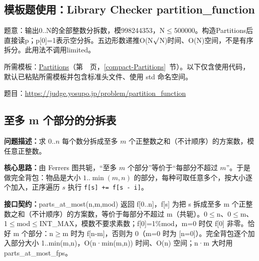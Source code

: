 

\Needspace{275pt}

\subsection*{模板题使用：Library Checker partition\_function}

\label{usage-example-158}

题意：输出0..N的全部整数分拆数，模998244353，N$\le$500000。构造Partitions后直接读p；p[0]=1表示空分拆。五边形数递推O(N$\sqrt{\vphantom x}$N)时间、O(N)空间，不是有序拆分。此用法不调用limited。

所需模板：\hyperref[compact-Partitions]{Partitions}（第~\pageref{compact-Partitions}~页，\ref{compact-Partitions}~节）。以下仅含使用代码，默认已粘贴所需模板并包含标准头文件、使用 std 命名空间。

题目：\url{https://judge.yosupo.jp/problem/partition_function}



\Needspace{284pt}

\subsection{至多 m 个部分的分拆表}\label{compact-parts_at_most}

\noindent\textbf{问题描述：}\allowbreak 求 $0..n$ 每个数分拆成至多 $m$ 个正整数之和（不计顺序）的方案数，模任意正整数。

\textbf{核心思路：}\allowbreak 由 Ferrers 图共轭，“至多 $m$ 个部分”等价于“每部分不超过 $m$”。于是做完全背包：物品是大小 $1..\min(m,n)$ 的部分，每种可取任意多个，按大小逐个加入，正序遍历 $s$ 执行 \texttt{f[s] += f[s - i]}。



{\sloppy{}\noindent\textbf{接口契约：}parts\_at\_most(n,m,mod) 返回 f[0..n]，f[s] 为把 s 拆成至多 m 个正整数之和（不计顺序）的方案数，等价于每部分不超过 m（共轭）。0$\le$n、0$\le$m、1$\le$mod$\le$INT\_MAX，模数不要求素数；f[0]=1\%mod，m=0 时仅 f[0] 非零。恰好 m 个部分：n$\ge$m 时为 f[n-m]，否则为 0（m=0 时为 [n=0]）。完全背包逐个加入部分大小 1..min(m,n)，O(n·min(m,n)) 时间、O(n) 空间；n·m 大时用 parts\_at\_most\_fps。\par}




